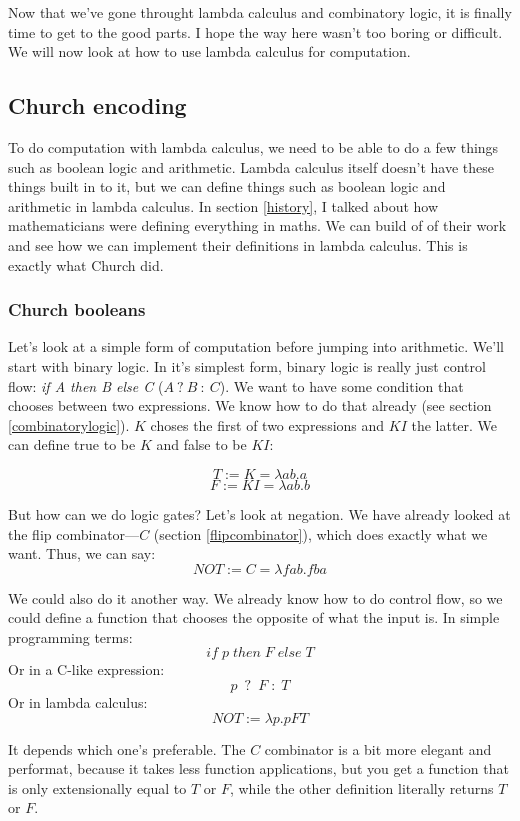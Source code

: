 \documentclass[11pt]{article}
\begin{document}
Now that we've gone throught lambda calculus and combinatory logic, it is
finally time to get to the good parts. I hope the way here wasn't too boring or
difficult. We will now look at how to use lambda calculus for computation.

\subsection{Church encoding}

To do computation with lambda calculus, we need to be able to do a few things
such as boolean logic and arithmetic. Lambda calculus itself doesn't have these
things built in to it, but we can define things such as boolean logic and
arithmetic in lambda calculus. In section \ref{history}, I talked about how
mathematicians were defining everything in maths. We can build of of their work
and see how we can implement their definitions in lambda calculus. This is
exactly what Church did.

\subsubsection{Church booleans}

Let's look at a simple form of computation before jumping into arithmetic.
We'll start with binary logic. In it's simplest form, binary logic is really
just control flow: \emph{if A then B else C} (\(A\:?\:B\::\:C\)). We want to
have some condition that chooses between two expressions. We know how to do
that already (see section \ref{combinatorylogic}). \(K\) choses the first of
two expressions and \(KI\) the latter. We can define true to be \(K\) and false
to be \(KI\):

\[T:=K=\lambda ab.a\]
\[F:=KI=\lambda ab.b\]

But how can we do logic gates? Let's look at negation. We have already looked
at the flip combinator---\(C\) (section \ref{flipcombinator}), which does
exactly what we want. Thus, we can say:
\[NOT:=C=\lambda fab.fba\]

We could also do it another way. We already know how to do control flow, so we
could define a function that chooses the opposite of what the input is. In
simple programming terms:
\[if\;p\;then\;F\;else\;T\]
Or in a C-like expression:
\[p\enspace ?\enspace F\;:\;T\]
Or in lambda calculus:
\[NOT:=\lambda p.pFT\]

It depends which one's preferable. The \(C\) combinator is a bit more elegant
and performat, because it takes less function applications, but you get a
function that is only extensionally equal to \(T\) or \(F\), while the other
definition literally returns \(T\) or \(F\).
\end{document}
